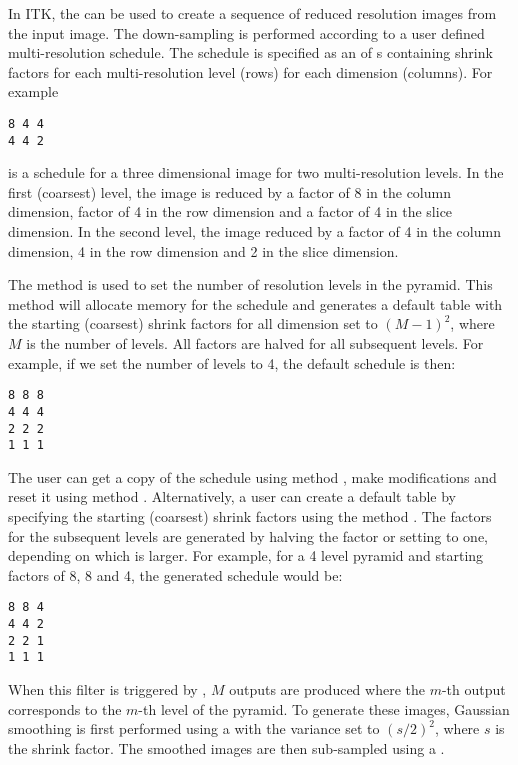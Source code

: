 

In ITK, the  can be used to create
a sequence of reduced resolution images from the input image.  The
down-sampling is performed according to a user defined multi-resolution
schedule. The schedule is specified as an  of s
containing shrink factors for each multi-resolution level (rows) for each
dimension (columns). For example

\small
\begin{verbatim}
8 4 4
4 4 2
\end{verbatim}
\normalsize

is a schedule for a three dimensional image for two multi-resolution levels. 
In the first (coarsest) level, the image is reduced by a factor of 8 
in the column dimension, factor of 4 in the row dimension and a factor
of 4 in the slice dimension. In the second level, the image reduced
by a factor of 4 in the column dimension, 4 in the row dimension and
2 in the slice dimension.


The method  is used to set the number of
resolution levels in the pyramid. This method will allocate memory
for the schedule and generates a default table with the starting
(coarsest) shrink factors for all dimension set to $(M-1)^2$, 
where $M$ is the number of levels. All factors are halved for
all subsequent levels. For example, if we set the number of levels
to 4, the default schedule is then:

\small
\begin{verbatim}
8 8 8
4 4 4
2 2 2
1 1 1
\end{verbatim}
\normalsize


The user can get a copy of the schedule using method ,
make modifications and reset it using method .
Alternatively, a user can create a default table by specifying the
starting (coarsest) shrink factors using the method 
. The factors for the subsequent
levels are generated by halving the factor or setting to one, 
depending on which is larger. For example, for a 4 level pyramid
and starting factors of 8, 8 and 4, the generated schedule would be:

\small
\begin{verbatim}
8 8 4
4 4 2
2 2 1
1 1 1
\end{verbatim}
\normalsize

When this filter is triggered by , $M$ outputs are produced
where the $m$-th output corresponds to the $m$-th level of the pyramid.
To generate these images, Gaussian smoothing is first performed using a
 with the variance set to $(s/2)^2$,
where $s$ is the shrink factor. The smoothed images are then sub-sampled using
a .
